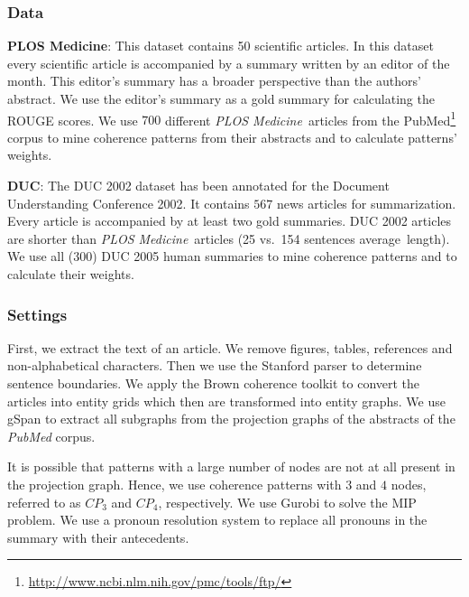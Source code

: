  \subsubsection{Data}
 \label{subsec:datasets}
 \textbf{PLOS Medicine}: This dataset contains 50 scientific articles.
In this dataset every scientific article is accompanied by a summary written by an editor of the month. This editor's summary has a broader perspective than the authors' abstract. We use the editor's summary as a gold summary for calculating the ROUGE scores. We use $700$ different \emph{PLOS Medicine}\ articles from the PubMed\footnote{\url{http://www.ncbi.nlm.nih.gov/pmc/tools/ftp/}} corpus to mine coherence patterns from their abstracts and to calculate patterns' weights.

\noindent
\textbf{DUC}: The DUC 2002 dataset has been annotated for the Document Understanding Conference 2002. It contains $567$ news articles  for summarization. Every article is accompanied by at least two gold summaries.
DUC 2002 articles are shorter than \emph{PLOS Medicine}\ articles (25 vs.\ 154 sentences average\ length). We use all ($300$) DUC 2005 human summaries to mine coherence patterns and to calculate their weights.

 \subsubsection{Settings}
%
First, we extract the text of an article.
We remove figures, tables, references and non-alphabetical characters.
Then we use the Stanford parser \cite{klein03b} to determine sentence boundaries.
 We apply the Brown coherence toolkit \cite{elsner11b} to convert the articles into entity grids \cite{barzilay08} which then are transformed into entity graphs. We use gSpan \cite{yanxifeng02} to extract all subgraphs from the projection graphs of the abstracts of the \emph{PubMed} corpus.

 It is possible that patterns with a large number of nodes are not at all present in the projection graph. Hence, we use coherence patterns with $3$ and $4$ nodes, referred to as $CP_3$ and $CP_4$, respectively.
We use Gurobi \cite{gurobi14} to solve the MIP problem.
 We use a pronoun resolution system \cite{martschat13} to replace all pronouns in the summary with their antecedents.

